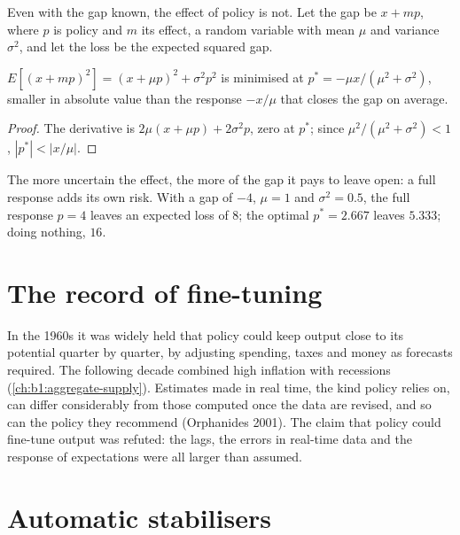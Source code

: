 Even with the gap known, the effect of policy is not. Let the gap be $x + mp$,
where $p$ is policy and $m$ its effect, a random variable with mean $\mu$ and
variance $\sigma^2$, and let the loss be the expected squared gap.

\begin{proposition}\label{prop:b1:stabilisation-policy:brainard}
$E[(x + mp)^2] = (x + \mu p)^2 + \sigma^2p^2$ is minimised at $p^* = -\mu x/(\mu^2 + \sigma^2)$, smaller in absolute value
than the response $-x/\mu$ that closes the gap on average.
\end{proposition}

\begin{proof}
The derivative is $2\mu(x + \mu p) + 2\sigma^2p$, zero at $p^*$; since $\mu^2/(\mu^2 + \sigma^2) < 1$, $|p^*| < |x/\mu|$.
\end{proof}

The more uncertain the effect, the more of the gap it pays to leave open:
a full response adds its own risk. With a gap of $-4$, $\mu = 1$ and $\sigma^2 = 0.5$, the full
response $p = 4$ leaves an expected loss of $8$; the optimal $p^* = 2.667$ leaves $5.333$;
doing nothing, $16$. %

\section{The record of fine-tuning}\label{sec:b1:stabilisation-policy:finetuning}

\begin{record}
In the 1960s it was widely held that policy could keep output close to its
potential quarter by quarter, by adjusting spending, taxes and money as
forecasts required. The following decade combined high inflation with
recessions (\cref{ch:b1:aggregate-supply}). Estimates made in real time,
the kind policy relies on, can differ considerably from those computed
once the data are revised, and so can the policy they recommend
(Orphanides 2001). %
The claim that policy could fine-tune output was refuted: the lags, the
errors in real-time data and the response of expectations were all larger
than assumed.
\end{record}

\section{Automatic stabilisers}\label{sec:b1:stabilisation-policy:automatic}

